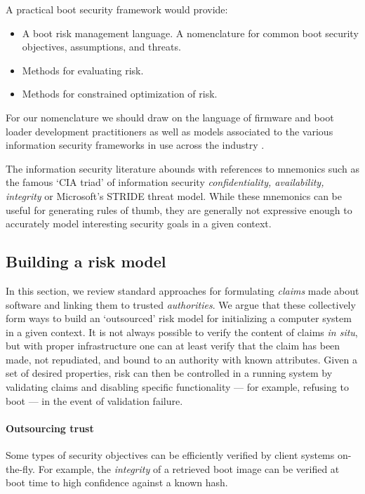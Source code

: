 A practical boot security framework would provide:
\begin{itemize}
  \item A boot risk management language. A nomenclature for common boot security objectives, assumptions, and threats.
  \item Methods for evaluating risk.
  \item Methods for constrained optimization of risk.
\end{itemize}
For our nomenclature we should draw on the language of firmware and boot loader development practitioners \cite{yao2020building} as well as models associated to the various information security frameworks in use across the industry \cite{taherdoost2022understanding}. 

\begin{remark}
  
  The information security literature abounds with references to mnemonics such as the famous `CIA triad' of information security \emph{confidentiality, availability, integrity} or Microsoft's STRIDE threat model.
  While these mnemonics can be useful for generating rules of thumb, they are generally not expressive enough to accurately model interesting security goals in a given context.

\end{remark}

\subsection{Building a risk model}

In this section, we review standard approaches for formulating \emph{claims} made about software and linking them to trusted \emph{authorities}.
%
We argue that these collectively form ways to build an `outsourced' risk model for initializing a computer system in a given context.
%
It is not always possible to verify the content of claims \emph{in situ}, but with proper infrastructure one can at least verify that the claim has been made, not repudiated, and bound to an authority with known attributes.
%
Given a set of desired properties, risk can then be controlled in a running system by validating claims and disabling specific functionality --- for example, refusing to boot --- in the event of validation failure.

\paragraph{Outsourcing trust}
Some types of security objectives can be efficiently verified by client systems on-the-fly.
%
For example, the \emph{integrity} of a retrieved boot image can be verified at boot time to high confidence against a known hash.

